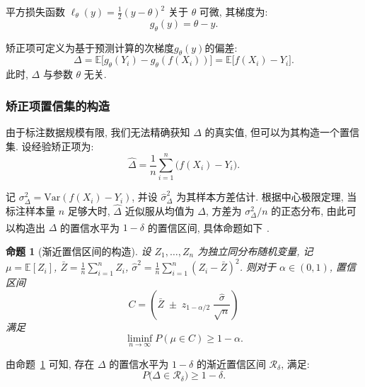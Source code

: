\documentclass[a4paper, AutoFakeBold, UTF8]{ctexrep}
\theoremstyle{plain}
\newtheorem{prop}{命题}[chapter]
\newcommand{\upcite}[1]
{\textsuperscript{~\cite{#1}}}
\numberwithin{equation}{chapter}
\begin{document}
平方损失函数 $\ell_{\theta} (y)  = \frac{1}{2} (y - \theta) ^2$ 关于 $\theta$ 可微, 其梯度为: 
\begin{equation}
g_{\theta} (y)  = \theta - y. \label{eq: grad}
\end{equation}

矫正项可定义为基于预测计算的次梯度$g_{\theta} (y) $的偏差: 
\begin{equation}
\Delta = \mathbb{E}\bigl[g_{\theta} (Y_i)  - g_{\theta} (f (X_i) ) \bigr] = \mathbb{E}\bigl[f (X_i)  - Y_i\bigr]. \label{eq: Delta}
\end{equation}
此时, $\Delta$ 与参数 $\theta$ 无关. 

\subsubsection{矫正项置信集的构造}

由于标注数据规模有限, 我们无法精确获知 $\Delta$ 的真实值, 但可以为其构造一个置信集. 设经验矫正项为: 
\begin{equation}
\hat{\Delta} = \frac{1}{n}\sum_{i=1}^{n} \bigl (f (X_i)  - Y_i\bigr). \label{eq: hat_Delta}
\end{equation}

记 $\sigma_{\Delta}^2 = \mathrm{Var} (f (X_i) -Y_i) $, 并设 $\hat{\sigma}_{\Delta}^2$ 为其样本方差估计. 根据中心极限定理, 当标注样本量 $n$ 足够大时, $\hat{\Delta}$ 近似服从均值为 $\Delta$, 方差为 $\sigma_{\Delta}^2/n$ 的正态分布, 由此可以构造出 $\Delta$ 的置信水平为 $1-\delta$ 的置信区间, 具体命题如下\upcite{Angelopoulos2023}. 

\begin{prop}[渐近置信区间的构造]
设 $Z_1, \ldots, Z_n$ 为独立同分布随机变量, 记 $\mu = \mathbb{E}[Z_i]$, $\bar{Z} = \frac{1}{n}\sum_{i=1}^n Z_i$, $\hat{\sigma}^2 = \frac{1}{n}\sum_{i=1}^n  (Z_i - \bar{Z}) ^2$. 则对于 $\alpha \in  (0,1) $, 置信区间
\begin{equation}
C = \left ( \bar{Z} \; \pm\;  z_{1-\alpha/2} \;  \frac{\hat{\sigma}}{\sqrt{n}} \right)  \label{eq: ci_general}
\end{equation} 
满足
\begin{equation}
\liminf_{n \to \infty} P (\mu \in C)  \geq 1 - \alpha. \label{eq: ci_coverage}
\end{equation} 
\label{prop: asym_ci}
\end{prop}

由命题~\ref{prop: asym_ci} 可知, 存在 $\Delta$ 的置信水平为 $1-\delta$ 的渐近置信区间 $\mathcal{R}_{\delta}$, 满足: 
\begin{equation}
P\bigl (\Delta \in \mathcal{R}_{\delta}\bigr)  \geq 1 - \delta. \label{eq: R_delta}
\end{equation}
\end{document}

